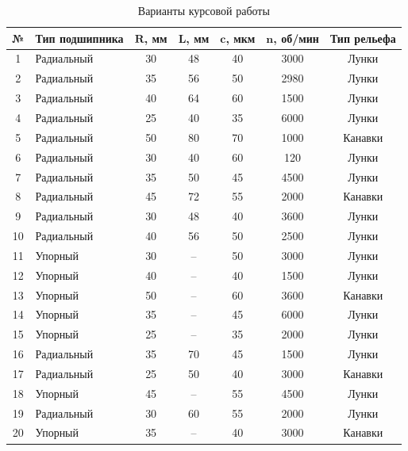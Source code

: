 \begin{table}[!ht]
\centering
\caption{Варианты курсовой работы}
\label{tab:variants}
\small
\begin{tabularx}{\textwidth}{|c|X|c|c|c|c|c|}
\hline
\textbf{№} & \textbf{Тип подшипника} & $\boldsymbol{R}$, \textbf{мм} & $\boldsymbol{L}$, \textbf{мм} & $\boldsymbol{c}$, \textbf{мкм} & $\boldsymbol{n}$, \textbf{об/мин} & \textbf{Тип рельефа} \\
\hline
1  & Радиальный & 30 & 48 & 40 & 3000 & Лунки \\
\hline
2  & Радиальный & 35 & 56 & 50 & 2980 & Лунки \\
\hline
3  & Радиальный & 40 & 64 & 60 & 1500 & Лунки \\
\hline
4  & Радиальный & 25 & 40 & 35 & 6000 & Лунки \\
\hline
5  & Радиальный & 50 & 80 & 70 & 1000 & Канавки \\
\hline
6  & Радиальный & 30 & 40 & 60 & 120  & Лунки \\
\hline
7  & Радиальный & 35 & 50 & 45 & 4500 & Лунки \\
\hline
8  & Радиальный & 45 & 72 & 55 & 2000 & Канавки \\
\hline
9  & Радиальный & 30 & 48 & 40 & 3600 & Лунки \\
\hline
10 & Радиальный & 40 & 56 & 50 & 2500 & Лунки \\
\hline
11 & Упорный    & 30 & --  & 50 & 3000 & Лунки \\
\hline
12 & Упорный    & 40 & --  & 40 & 1500 & Лунки \\
\hline
13 & Упорный    & 50 & --  & 60 & 3600 & Канавки \\
\hline
14 & Упорный    & 35 & --  & 45 & 6000 & Лунки \\
\hline
15 & Упорный    & 25 & --  & 35 & 2000 & Лунки \\
\hline
16 & Радиальный & 35 & 70 & 45 & 1500 & Лунки \\
\hline
17 & Радиальный & 25 & 50 & 40 & 3000 & Канавки \\
\hline
18 & Упорный    & 45 & --  & 55 & 4500 & Лунки \\
\hline
19 & Радиальный & 30 & 60 & 55 & 2000 & Лунки \\
\hline
20 & Упорный    & 35 & --  & 40 & 3000 & Канавки \\
\hline
\end{tabularx}
\end{table}

\FloatBarrier

